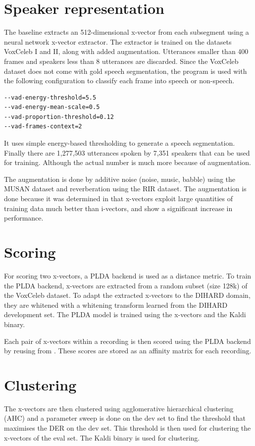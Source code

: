 \section{Speaker representation}
The baseline extracts an 512-dimensional x-vector from each subsegment using a neural network x-vector extractor. The extractor is trained on the datasets VoxCeleb I and II, along with added augmentation. Utterances smaller than 400 frames and speakers less than 8 utterances are discarded. Since the VoxCeleb dataset does not come with gold speech segmentation, the program  is used with the following configuration to classify each frame into speech or non-speech.

\begin{verbatim}
--vad-energy-threshold=5.5
--vad-energy-mean-scale=0.5
--vad-proportion-threshold=0.12
--vad-frames-context=2
\end{verbatim}

It uses simple energy-based thresholding to generate a speech segmentation. Finally there are 1,277,503 utterances spoken by 7,351 speakers that can be used for training. Although the actual number is much more because of augmentation.

The augmentation is done by additive noise (noise, music, babble) using the MUSAN dataset and reverberation using the RIR dataset. The augmentation is done because it was determined in \cite{snyder2018x} that x-vectors exploit large quantities of training data much better than i-vectors, and show a significant increase in performance.

\section{Scoring}
For scoring two x-vectors, a PLDA backend is used as a distance metric. To train the PLDA backend, x-vectors are extracted from a random subset (size 128k) of the VoxCeleb dataset. To adapt the extracted x-vectors to the DIHARD domain, they are whitened with a whitening transform learned from the DIHARD development set. The PLDA model is trained using the x-vectors and the  Kaldi binary.

Each pair of x-vectors within a recording is then scored using the PLDA backend by reusing  from . These scores are stored as an affinity matrix for each recording.

\section{Clustering}
The x-vectors are then clustered using agglomerative hierarchical clustering (AHC) and a parameter sweep is done on the dev set to find the threshold that maximises the DER on the dev set. This threshold is then used for clustering the x-vectors of the eval set. The  Kaldi binary is used for clustering.


